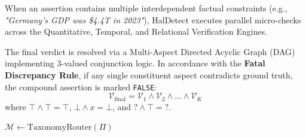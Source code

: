 When an assertion contains multiple interdependent factual constraints (e.g., \textit{"Germany's GDP was \$4.4T in 2023"}), HalDetect executes parallel micro-checks across the Quantitative, Temporal, and Relational Verification Engines.

The final verdict is resolved via a Multi-Aspect Directed Acyclic Graph (DAG) implementing 3-valued conjunction logic. In accordance with the \textbf{Fatal Discrepancy Rule}, if any single constituent aspect contradicts ground truth, the compound assertion is marked \texttt{FALSE}:
\begin{equation}
    \mathcal{V}_{\text{final}} = \mathcal{V}_1 \wedge \mathcal{V}_2 \wedge \dots \wedge \mathcal{V}_K
\end{equation}
where $\top \wedge \top = \top$, $\bot \wedge x = \bot$, and $? \wedge \top = ?$.

\begin{algorithm}[htbp]
\small
\SetAlgoLined
{}
$\mathcal{M} \leftarrow \text{TaxonomyRouter}(\Pi)$\;
\;
\caption{Multi-Aspect Modality Routing and Neuro-Symbolic Verification}
\label{alg:verification}
\end{algorithm}
